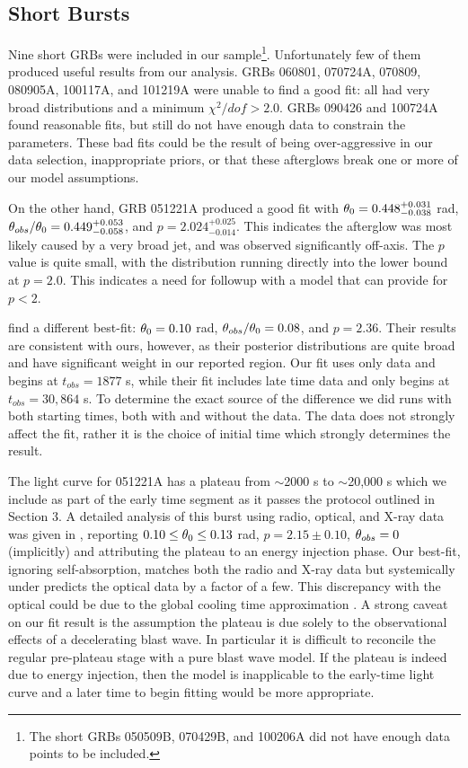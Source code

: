 \subsection{Short Bursts}

Nine short GRBs were included in our sample\footnote{The short GRBs 050509B, 070429B, and 100206A did not have enough data points to be included.}.  Unfortunately few of them produced useful results from our analysis.  GRBs 060801, 070724A, 070809, 080905A, 100117A, and 101219A were unable to find a good fit: all had very broad distributions and a minimum $\chi^2/dof  > 2.0$.  GRBs 090426 and 100724A found reasonable fits, but still do not have enough data to constrain the parameters.  These bad fits could be the result of being over-aggressive in our data selection, inappropriate priors, or that these afterglows break one or more of our model assumptions.  

On the other hand, GRB 051221A produced a good fit with $\theta_0 = 0.448^{+0.031}_{-0.038}$ rad, $\theta_{obs}/\theta_0 = 0.449^{+0.053}_{-0.058}$, and $p = 2.024^{+0.025}_{-0.014}$.  This indicates the afterglow was most likely caused by a very broad jet, and was observed significantly off-axis.  The $p$ value is quite small, with the distribution running directly into the lower bound at $p = 2.0$.  This indicates a need for followup with a model that can provide for $p < 2$.

\citet{Zhang14} find a different best-fit: $\theta_0 = 0.10$ rad, $\theta_{obs}/\theta_0 = 0.08$, and $p=2.36$.  Their results are consistent with ours, however, as their posterior distributions are quite broad and have significant weight in our reported region.  Our fit uses only \swiftXRT{} data and begins at $t_{obs} = 1877$ s, while their fit includes late time \chandra{} data and only begins at $t_{obs} = 30,864$ s.  To determine the exact source of the difference we did runs with both starting times, both with and without the \chandra{} data.  The \chandra{} data does not strongly affect the fit, rather it is the choice of initial time which strongly determines the result.  

The light curve for 051221A has a plateau from $\sim$2000 s to $\sim$20,000 s which we include as part of the early time segment as it passes the protocol outlined in Section 3.  A detailed analysis of this burst using radio, optical, and X-ray data was given in \citet{Soderberg06}, reporting $0.10 \leq \theta_0 \leq 0.13$ rad, $p = 2.15 \pm 0.10$, $\theta_{obs}=0$ (implicitly) and attributing the plateau to an energy injection phase.  Our best-fit, ignoring self-absorption, matches both the radio and X-ray data but systemically under predicts the optical data by a factor of a few.  This discrepancy with the optical could be due to the global cooling time approximation \citep{vanEer10offaxis, Guidorzi14}.  A strong caveat on our fit result is the assumption the plateau is due solely to the observational effects of a decelerating blast wave.  In particular it is difficult to reconcile the regular pre-plateau stage with a pure blast wave model.  If the plateau is indeed due to energy injection, then the \scalefit{} model is inapplicable to the early-time light curve and a later time to begin fitting would be more appropriate.  

